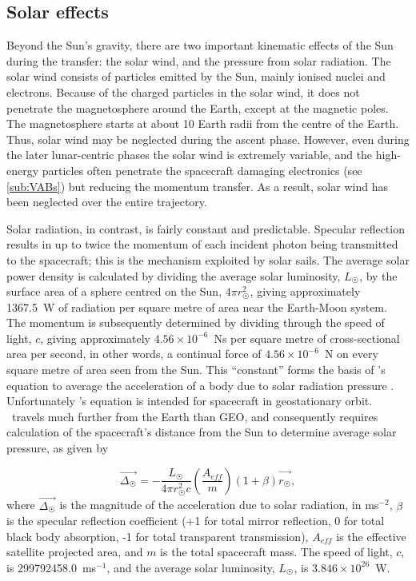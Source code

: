 \subsection{Solar effects} \label{sub:Solar-Wind}

Beyond the Sun's gravity, there are two important kinematic effects of the Sun during the transfer: the solar wind, and the pressure from solar radiation. The solar wind consists of particles emitted by the Sun, mainly ionised nuclei and electrons. Because of the charged particles in the solar wind, it does not penetrate the magnetosphere around the Earth, except at the magnetic poles. The magnetosphere starts at about 10 Earth radii from the centre of the Earth. Thus, solar wind may be neglected during the ascent phase. However, even during the later lunar-centric phases the solar wind is extremely variable, and the high-energy particles often penetrate the spacecraft damaging electronics (see \autoref{sub:VABs}) but reducing the momentum transfer. As a result, solar wind has been neglected over the entire trajectory.

Solar radiation, in contrast, is fairly constant and predictable. Specular reflection results in up to twice the momentum of each incident photon being transmitted to the spacecraft; this is the mechanism exploited by solar sails. The average solar power density is calculated by dividing the average solar luminosity, $L_\Sun$,  by the surface area of a sphere centred on the Sun, $4\pi r_\Sun^2$, giving approximately 1367.5~W of radiation per square metre of area near the Earth-Moon system. The momentum is subsequently determined by dividing through the speed of light, $c$, giving approximately $4.56\times10^{-6}$~Ns per square metre of cross-sectional area per second, in other words, a continual force of $4.56\times10^{-6}$~N on every square metre of area seen from the Sun. This \enquote{constant} forms the basis of \citeauthor{Chobotov2002}'s equation to average the acceleration of a body due to solar radiation pressure \parencite[p. 223]{Chobotov2002}. Unfortunately \citeauthor{Chobotov2002}'s equation is intended for spacecraft in geostationary orbit. \BW\ travels much further from the Earth than GEO, and consequently requires calculation of the spacecraft's distance from the Sun to determine average solar pressure, as given by

\begin{equation}\label{eq:solar-wind}
\vec{\Delta_\Sun} = -\frac{L_\Sun}{4\pi r_\Sun^2c}\left(\frac{A_{eff}}{m}\right)(1+\beta)\vec{\hat{r_\Sun}},
\end{equation}
where $\vec{\Delta_\Sun}$ is the magnitude of the acceleration due to solar radiation, in ms$^{-2}$, $\beta$ is the specular reflection coefficient (+1 for total mirror reflection, 0 for total black body absorption, -1 for total transparent transmission), $A_{eff}$ is the effective satellite projected area, and $m$ is the total spacecraft mass. The speed of light, $c$, is 299792458.0~ms$^{-1}$, and the average solar luminosity, $L_\Sun$, is $3.846\times10^{26}$~W.

